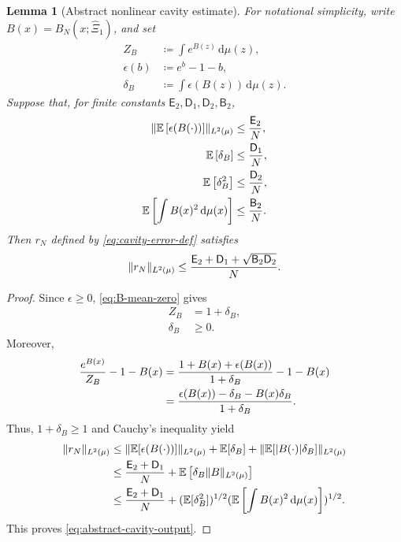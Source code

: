 \documentclass[11pt,reqno]{amsart}
\numberwithin{equation}{section}
\theoremstyle{plain}
\newtheorem{lemma}[lemma]{Lemma}
\theoremstyle{remark}
\DeclarePairedDelimiter{\pa}{\lparen}{\rparen}
\DeclarePairedDelimiter{\norm}{\lVert}{\rVert}
\newcommand{\md}{\mathrm{d}}
\newcommand{\E}{{\mathbb{E}}}
\begin{document}
\begin{lemma}[Abstract nonlinear cavity estimate]\label{lem:abstract-cavity-linearization}
For notational simplicity, write \(B(x)=B_N(x;\hat\Xi_1)\), and set
\begin{align}
 Z_B&\coloneqq \int e^{B(z)}\,\md\mu(z),\label{eq:ZB-def}\\
 \epsilon(b)&\coloneqq e^b-1-b,\label{eq:epsilon-def}\\
 \delta_B&\coloneqq \int \epsilon(B(z))\,\md\mu(z).\label{eq:deltaB-def}
\end{align}
Suppose that, for finite constants \(\mathsf E_2,\mathsf D_1,\mathsf D_2,\mathsf B_2\),
\begin{subequations}\label{eq:abstract-cavity-inputs}
\begin{align}
 \norm{\E\left[\epsilon(B(\cdot))\right]}_{L^2(\mu)}
 &\le \frac{\mathsf E_2}{N},\label{eq:abstract-cavity-input-E}\\
 \E\left[\delta_B\right]
 &\le \frac{\mathsf D_1}{N},\label{eq:abstract-cavity-input-D1}\\
 \E\left[\delta_B^2\right]
 &\le \frac{\mathsf D_2}{N},\label{eq:abstract-cavity-input-D2}\\
 \E\left[\int B(x)^2\,\md\mu(x)\right]
 &\le \frac{\mathsf B_2}{N}.\label{eq:abstract-cavity-input-B}
\end{align}
\end{subequations}
Then \(r_N\) defined by \eqref{eq:cavity-error-def} satisfies
\begin{align}\label{eq:abstract-cavity-output}
 \norm{r_N}_{L^2(\mu)}
 \le \frac{\mathsf E_2+\mathsf D_1+\sqrt{\mathsf B_2\mathsf D_2}}{N}.
\end{align}
\end{lemma}

\begin{proof}
Since \(\epsilon\ge0\), \eqref{eq:B-mean-zero} gives
\begin{align}
 Z_B&=1+\delta_B,\label{eq:ZB-deltaB}\\
 \delta_B&\ge0.\label{eq:deltaB-nonnegative}
\end{align}
Moreover,
\begin{align}
 \frac{e^{B(x)}}{Z_B}-1-B(x)
 &=\frac{1+B(x)+\epsilon(B(x))}{1+\delta_B}-1-B(x)\notag\\
 &=\frac{\epsilon(B(x))-\delta_B-B(x)\delta_B}{1+\delta_B}.\label{eq:normalized-exponential-remainder}
\end{align}
Thus, \(1+\delta_B\ge1\) and Cauchy's inequality yield
\begin{align}
 \norm{r_N}_{L^2(\mu)}
 &\le \norm{\E[\epsilon(B(\cdot))]}_{L^2(\mu)}
 +\E[\delta_B]+\norm{\E[|B(\cdot)|\delta_B]}_{L^2(\mu)}\notag\\
 &\le \frac{\mathsf E_2+\mathsf D_1}{N}
 +\E\left[\delta_B\norm{B}_{L^2(\mu)}\right]\notag\\
 &\le \frac{\mathsf E_2+\mathsf D_1}{N}
 +\pa{\E[\delta_B^2]}^{1/2}
  \pa{\E\left[\int B(x)^2\,\md\mu(x)\right]}^{1/2}.\label{eq:abstract-cavity-proof-bound}
\end{align}
This proves \eqref{eq:abstract-cavity-output}.
\end{proof}
\end{document}
